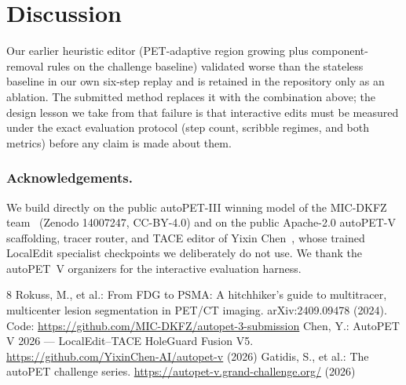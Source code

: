 \documentclass[runningheads]{llncs}
\begin{document}
\section{Discussion}

Our earlier heuristic editor (PET-adaptive region growing plus
component-removal rules on the challenge baseline) validated worse than
the stateless baseline in our own six-step replay and is retained in the
repository only as an ablation. The submitted method replaces it with the
combination above; the design lesson we take from that failure is that
interactive edits must be measured under the exact evaluation protocol
(step count, scribble regimes, and both metrics) before any claim is made
about them.

\subsubsection{Acknowledgements.}
We build directly on the public autoPET-III winning model of the MIC-DKFZ
team~\cite{lesiontracer} (Zenodo 14007247, CC-BY-4.0) and on the public
Apache-2.0 autoPET-V scaffolding, tracer router, and TACE editor of Yixin
Chen~\cite{autopetvrepo}, whose trained LocalEdit specialist checkpoints we
deliberately do not use. We thank the autoPET~V organizers for the
interactive evaluation harness.

\begin{thebibliography}{8}
Rokuss, M., et al.: From FDG to PSMA: A hitchhiker's guide to multitracer,
multicenter lesion segmentation in PET/CT imaging. arXiv:2409.09478 (2024).
Code: \url{https://github.com/MIC-DKFZ/autopet-3-submission}
Chen, Y.: AutoPET V 2026 --- LocalEdit--TACE HoleGuard Fusion V5.
\url{https://github.com/YixinChen-AI/autopet-v} (2026)
Gatidis, S., et al.: The autoPET challenge series.
\url{https://autopet-v.grand-challenge.org/} (2026)
\end{thebibliography}
\end{document}
